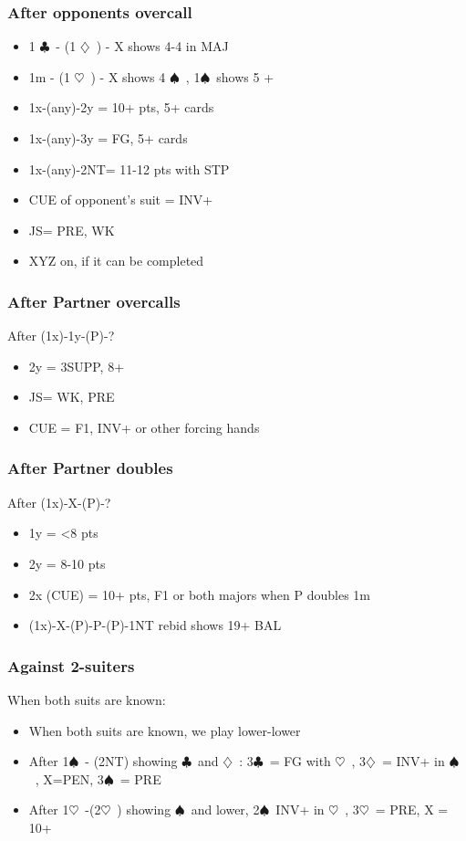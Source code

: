 \documentclass{article}
\newcommand\C{\ensuremath{\clubsuit}}
\newcommand\D{\ensuremath{\diamondsuit}}
\renewcommand\H{\ensuremath{\heartsuit}}
\renewcommand\S{\ensuremath{\spadesuit}}
\begin{document}
\begin{multicols}{2}
  \subsubsection{After opponents overcall}
  \begin{itemize}
    \item 1 \C\ - (1 \D\ ) - X shows 4-4 in MAJ 
    \item 1m - (1 \H\ ) - X shows 4 \S\ , 1\S\  shows 5 +
    \item 1x-(any)-2y = 10+ pts, 5+  cards
    \item 1x-(any)-3y = FG, 5+  cards
    \item 1x-(any)-2NT= 11-12 pts with STP
    \item CUE of opponent's suit = INV+
    \item JS= PRE, WK
    \item XYZ on, if it can be completed
  \end{itemize}
  \subsubsection{After Partner overcalls}
  After (1x)-1y-(P)-?
  \begin{itemize}
    \item 2y = 3SUPP, 8+
     \item JS= WK, PRE
     \item CUE = F1, INV+ or other forcing hands
  \end{itemize}
  \subsubsection{After Partner doubles}
  After (1x)-X-(P)-?
  \begin{itemize}
    \item 1y = <8 pts
    \item 2y = 8-10 pts
    \item 2x (CUE) = 10+ pts, F1 or both majors when P doubles 1m
     \item (1x)-X-(P)-P-(P)-1NT rebid shows 19+ BAL
  \end{itemize}
  \subsubsection{Against 2-suiters}
  \label{twosdefence}
  When both suits are known:
  \begin{itemize}
    \item When both suits are known, we play lower-lower
    \item After 1\S\ - (2NT) showing \C\ and \D\ : 3\C\ = FG with \H\ , 3\D\ = INV+ in \S\ , X=PEN, 3\S\ = PRE
    \item After 1\H\ -(2\H\ ) showing \S\ and lower, 2\S\ INV+ in \H\ , 3\H\ = PRE, X = 10+ 
    \end{itemize}

\end{multicols}
\end{document}
